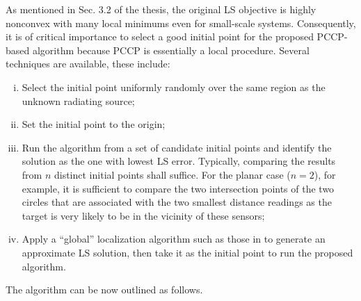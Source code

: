 As mentioned in Sec. 3.2 of the thesis, the original LS objective is highly nonconvex with many local minimums even for small-scale systems. Consequently, it is of critical importance to select a good initial point for the proposed PCCP-based algorithm because PCCP is essentially a local procedure. Several techniques are available, these include: 
\begin{enumerate}[(i)]
\item
Select the initial point uniformly randomly over the same region as the unknown radiating source; 
\item
Set the initial point to the origin; 
\item
Run the algorithm from a set of candidate initial points and identify the solution as the one with lowest LS error. Typically, comparing the results from $n$ distinct initial points shall suffice. For the planar case ($n = 2$), for example, it is sufficient to compare the two intersection points of the two circles that are associated with the two smallest distance readings as the target is very likely to be in the vicinity of these sensors; 
\item
Apply a “global” localization algorithm such as those in \cite{BeckStLi} to generate an approximate LS solution, then take it as the initial point to run the proposed algorithm. 
\end{enumerate}


The algorithm can be now outlined as follows.


